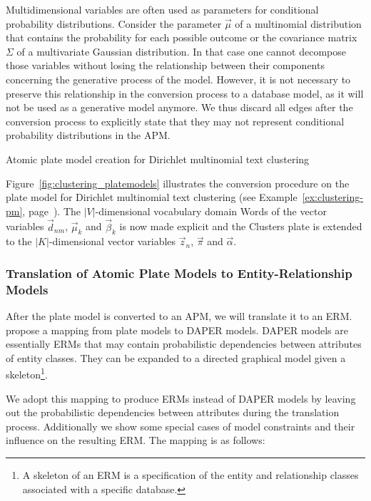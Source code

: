 Multidimensional variables are often used as parameters for conditional probability distributions. Consider the parameter $\vec \mu$ of a multinomial distribution that contains the probability for each possible outcome or the covariance matrix $\Sigma$ of a multivariate Gaussian distribution. In that case one cannot decompose those variables without losing the relationship between their components concerning the generative process of the model. However, it is not necessary to preserve this relationship in the conversion process to a database model, as it will not be used as a generative model anymore. We thus discard all edges after the conversion process to explicitly state that they may not represent conditional probability distributions in the APM.

\begin{Example} Atomic plate model creation for Dirichlet multinomial text clustering
\label{ex:clustering-apm}

Figure~\ref{fig:clustering_platemodels} illustrates the conversion procedure on the plate model for Dirichlet multinomial text clustering (see Example~\ref{ex:clustering-pm}, page~\pageref{ex:clustering-pm}). The $|V|$-dimensional vocabulary domain Words of the vector variables $\vec d_{nm}$, $\vec \mu_k$ and $\vec \beta_k$ is now made explicit and the Clusters plate is extended to the $|K|$-dimensional vector variables $\vec z_n$, $\vec \pi$ and $\vec \alpha$.

\end{Example}

\subsubsection{Translation of Atomic Plate Models to Entity-Relationship Models}

After the plate model is converted to an APM, we will translate it to an ERM. \textcite{heckerman2007probabilistic} propose a mapping from plate models to DAPER models. DAPER models are essentially ERMs that may contain probabilistic dependencies between attributes of entity classes. They can be expanded to a directed graphical model given a skeleton\footnote{A skeleton of an ERM is a specification of the entity and relationship classes associated with a specific database.}.

We adopt this mapping to produce ERMs instead of DAPER models by leaving out the probabilistic dependencies between attributes during the translation process. Additionally we show some special cases of model constraints and their influence on the resulting ERM. The mapping is as follows:

